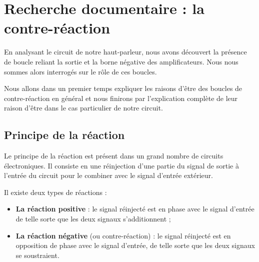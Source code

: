 

\section{Recherche documentaire : la contre-réaction}
En analysant le circuit de notre haut-parleur, nous avons découvert la présence de boucle reliant la sortie et la borne négative des amplificateurs. Nous nous sommes alors interrogés sur le rôle de ces boucles.

Nous allons dans un premier temps expliquer les raisons d'être des boucles de contre-réaction en général et nous finirons par l'explication complète de leur raison d'être dans le cas particulier de notre circuit.



\subsection{Principe de la réaction}
Le principe de la réaction est présent dans un grand nombre de circuits électroniques. Il consiste en une réinjection d'une partie du signal de sortie à l'entrée du circuit pour le combiner avec le signal d'entrée extérieur.

Il existe deux types de réactions :

\begin{itemize}
	\item \textbf{La réaction positive} : le signal réinjecté est en phase avec le signal d'entrée de telle sorte que les deux signaux s'additionnent ;
	\item \textbf{La réaction négative} (ou contre-réaction) : le signal réinjecté est en opposition de phase avec le signal d'entrée, de telle sorte que les deux signaux
	se soustraient.
\end{itemize}

